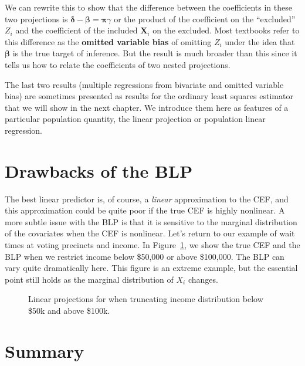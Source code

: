 \documentclass[
  13pt,
  letterpaper,
  DIV=11,
  numbers=noendperiod]{scrreprt}
\newcommand{\bs}{\symbf}
\newcommand{\mb}{\symbf}
\newcommand{\X}{\mb{X}}
\newcommand{\bfbeta}{\mb{\beta}}
\theoremstyle{definition}
\theoremstyle{definition}
\theoremstyle{plain}
\theoremstyle{remark}
\begin{document}
We can rewrite this to show that the difference between the coefficients
in these two projections is \(\bs{\delta} - \bfbeta= \bs{\pi}\gamma\) or
the product of the coefficient on the ``excluded'' \(Z_i\) and the
coefficient of the included \(\X_i\) on the excluded. Most textbooks
refer to this difference as the \textbf{omitted variable bias} of
omitting \(Z_i\) under the idea that \(\bfbeta\) is the true target of
inference. But the result is much broader than this since it tells us
how to relate the coefficients of two nested projections.

The last two results (multiple regressions from bivariate and omitted
variable bias) are sometimes presented as results for the ordinary least
squares estimator that we will show in the next chapter. We introduce
them here as features of a particular population quantity, the linear
projection or population linear regression.

\section{Drawbacks of the BLP}\label{drawbacks-of-the-blp}

The best linear predictor is, of course, a \emph{linear} approximation
to the CEF, and this approximation could be quite poor if the true CEF
is highly nonlinear. A more subtle issue with the BLP is that it is
sensitive to the marginal distribution of the covariates when the CEF is
nonlinear. Let's return to our example of wait times at voting precincts
and income. In Figure~\ref{fig-blp-limits}, we show the true CEF and the
BLP when we restrict income below \$50,000 or above \$100,000. The BLP
can vary quite dramatically here. This figure is an extreme example, but
the essential point still holds as the marginal distribution of \(X_i\)
changes.

\begin{figure}[th]


\caption{\label{fig-blp-limits}Linear projections for when truncating
income distribution below \$50k and above \$100k.}

\end{figure}%

\section{Summary}\label{summary-4}
\end{document}
